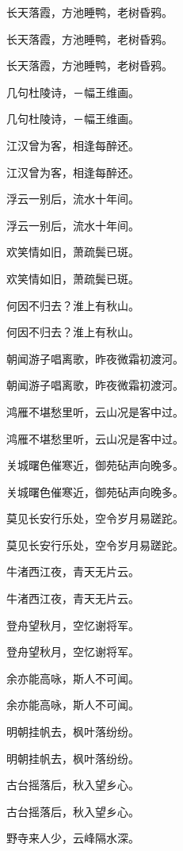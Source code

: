 \documentclass[12pt, a4paper, addpoints]{exam}
\begin{document}
\begin{questions}
\question[3] 长天落霞，方池睡鸭，老树昏鸦。

\question[3] 长天落霞，方池睡鸭，老树昏鸦。

\question[3] 长天落霞，方池睡鸭，老树昏鸦。

\question[3] 几句杜陵诗，－幅王维画。

\question[3] 几句杜陵诗，－幅王维画。

\question[3] 江汉曾为客，相逢每醉还。

\question[3] 江汉曾为客，相逢每醉还。

\question[3] 浮云一别后，流水十年间。

\question[3] 浮云一别后，流水十年间。

\question[3] 欢笑情如旧，萧疏鬓已斑。

\question[3] 欢笑情如旧，萧疏鬓已斑。

\question[3] 何因不归去？淮上有秋山。

\question[3] 何因不归去？淮上有秋山。

\question[3] 朝闻游子唱离歌，昨夜微霜初渡河。

\question[3] 朝闻游子唱离歌，昨夜微霜初渡河。

\question[3] 鸿雁不堪愁里听，云山况是客中过。

\question[3] 鸿雁不堪愁里听，云山况是客中过。

\question[3] 关城曙色催寒近，御苑砧声向晚多。

\question[3] 关城曙色催寒近，御苑砧声向晚多。

\question[3] 莫见长安行乐处，空令岁月易蹉跎。

\question[3] 莫见长安行乐处，空令岁月易蹉跎。

\question[3] 牛渚西江夜，青天无片云。

\question[3] 牛渚西江夜，青天无片云。

\question[3] 登舟望秋月，空忆谢将军。

\question[3] 登舟望秋月，空忆谢将军。

\question[3] 余亦能高咏，斯人不可闻。

\question[3] 余亦能高咏，斯人不可闻。

\question[3] 明朝挂帆去，枫叶落纷纷。

\question[3] 明朝挂帆去，枫叶落纷纷。

\question[3] 古台摇落后，秋入望乡心。

\question[3] 古台摇落后，秋入望乡心。

\question[3] 野寺来人少，云峰隔水深。


\end{questions}
\end{document}
